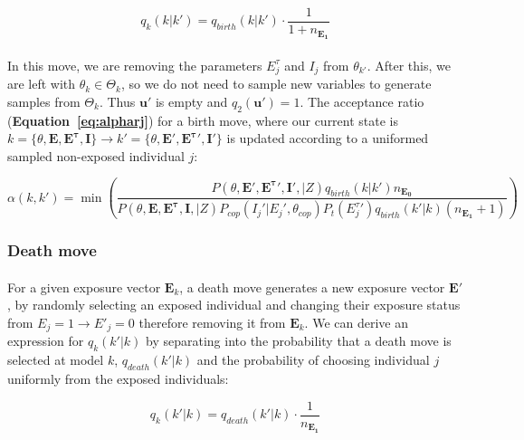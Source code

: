 \documentclass{article}
\begin{document}
\begin{equation}
q_k(k | k') = q_{birth}(k |k')\cdot \frac{1}{1 + n_{\mathbf{E_1}}}
\end{equation}


\paragraph{}In this move, we are removing the parameters $E_j^\tau$ and $I_j$ from $\theta_{k'}$. After this, we are left with $\theta_k \in \Theta_k$, so we do not need to sample new variables to generate samples from $\Theta_k$. Thus $\mathbf{u}'$ is empty and  $q_2(\mathbf{u}') = 1$. The acceptance ratio (\textbf{Equation~\ref{eq:alpharj}}) for a birth move, where our current state is $k = \{\theta, \mathbf{E}, \mathbf{E^\tau}, \mathbf{I}\} \rightarrow k' = \{\theta, \mathbf{E}', \mathbf{E^\tau}', \mathbf{I}'\}$ is updated according to a uniformed sampled non-exposed individual $j$:

\begin{equation}
\label{acc:birth}
\alpha(k, k') = \min\left(\frac{P(\theta, \mathbf{E}', \mathbf{E^\tau}', \mathbf{I}', | Z)q_{birth}(k|k')n_{\mathbf{E_0}}}{P(\theta, \mathbf{E}, \mathbf{E^\tau}, \mathbf{I}, | Z)P_{cop}(I_{j}' | E_{j}', \theta_{cop})P_t(E^\tau_j')q_{birth}(k'|k)(n_{\mathbf{E_1}} + 1)} \right)
\end{equation}


\subsubsection{Death move}


\paragraph{}For a given exposure vector $\mathbf{E}_k$, a death move generates a new exposure vector $\mathbf{E'}$, by randomly selecting an exposed individual and changing their exposure status from $E_j = 1 \rightarrow E'_j = 0$ therefore removing it from $\mathbf{E}_k$. We can derive an expression for $q_k(k' | k)$ by separating into the probability that a death move is selected at model $k$, $q_{death}(k' |k)$ and the probability of choosing individual $j$ uniformly from the exposed individuals:

\begin{equation}
q_k(k' | k) = q_{death}(k' |k)\cdot \frac{1}{n_{\mathbf{E_1}}}
\end{equation}
\end{document}
